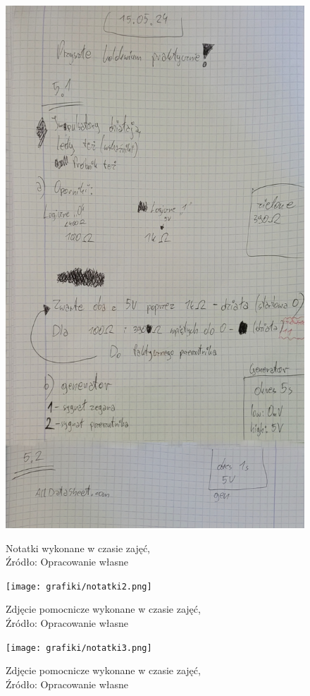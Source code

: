\documentclass{article}
\begin{document}
    \begin{figure}[!ht]
      \begin{minipage}{.5\textwidth}
        \centering
        \includegraphics[scale=0.2]{grafiki/notatki1.png}
        \caption{Notatki wykonane w czasie zajęć,
        \\Źródło: Opracowanie własne}
      \end{minipage}
      \begin{minipage}{.5\textwidth}
        \centering
        \texttt{[image: grafiki/notatki2.png]}
        \caption{Zdjęcie pomocnicze wykonane w czasie zajęć,
        \\Źródło: Opracowanie własne}
      \end{minipage}
    \end{figure}

    \begin{figure}[!ht]
      \centering
      \texttt{[image: grafiki/notatki3.png]}
      \caption{Zdjęcie pomocnicze wykonane w czasie zajęć,
      \\Źródło: Opracowanie własne}
    \end{figure}
\end{document}
